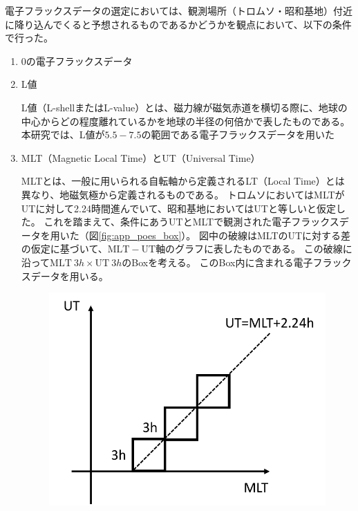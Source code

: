 電子フラックスデータの選定においては、観測場所（トロムソ・昭和基地）付近に降り込んでくると予想されるものであるかどうかを観点において、以下の条件で行った。
\begin{enumerate}
    \item 0\textdegree の電子フラックスデータ
    \item L値
    \par
    L値（L-shellまたはL-value）とは、磁力線が磁気赤道を横切る際に、地球の中心からどの程度離れているかを地球の半径の何倍かで表したものである。
    本研究では、L値が$5.5-7.5$の範囲である電子フラックスデータを用いた

    \item MLT（Magnetic Local Time）とUT（Universal Time）
    \par
    MLTとは、一般に用いられる自転軸から定義されるLT（Local Time）とは異なり、地磁気極から定義されるものである。
    トロムソにおいてはMLTがUTに対して2.24時間進んでいて、昭和基地においてはUTと等しいと仮定した。
    これを踏まえて、条件にあうUTとMLTで観測された電子フラックスデータを用いた（図\ref{fig:app_poes_box}）。
    図中の破線はMLTのUTに対する差の仮定に基づいて、$\mathrm{MLT}-\mathrm{UT}$軸のグラフに表したものである。
    この破線に沿って$\mathrm{MLT}\ 3h \times \mathrm{UT}\ 3h$のBoxを考える。
    このBox内に含まれる電子フラックスデータを用いる。
    \begin{figure}[htbp]
        \centering
        \begin{minipage}{.495\linewidth}
            \centering
            \includegraphics[scale=0.5]{master_thesis_contents/master_thesis_fig/app_poes_box_tromsoe.pdf}

\end{minipage}
\end{figure}
\end{enumerate}
